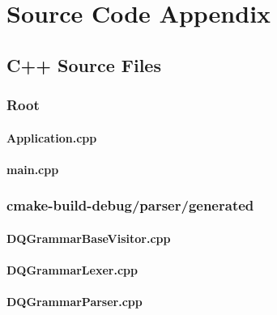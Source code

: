 
\chapter{Source Code Appendix}

\section{C++ Source Files}

\subsection*{Root}

\subsubsection*{Application.cpp}


\subsubsection*{main.cpp}


\subsection*{cmake-build-debug/parser/generated}

\subsubsection*{DQGrammarBaseVisitor.cpp}


\subsubsection*{DQGrammarLexer.cpp}


\subsubsection*{DQGrammarParser.cpp}


